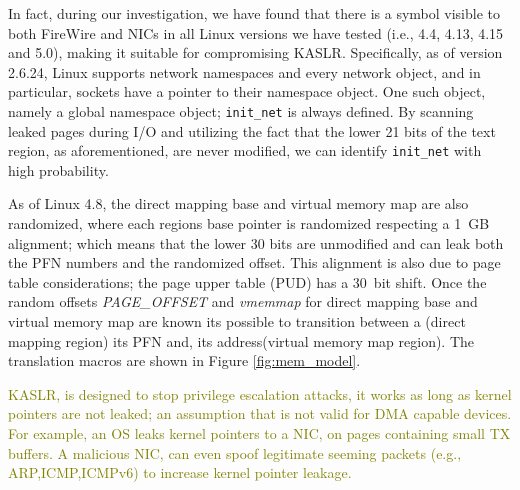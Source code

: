In fact, during our investigation, we have found that there is a symbol visible to both FireWire and NICs in all Linux versions we have tested (i.e., 4.4, 4.13, 4.15 and 5.0), making it suitable for compromising KASLR. Specifically, as of version 2.6.24, Linux supports network namespaces and every network object, and in particular, sockets have a pointer to their namespace object. One such object, namely a global namespace object; \texttt{init\_net} is always defined. By scanning leaked pages during I/O and utilizing the fact that the lower 21 bits of the text region, as aforementioned, are never modified, we can identify \texttt{init\_net} with high probability.

As of Linux 4.8, the direct mapping base and virtual memory map are also randomized, where each regions base pointer is randomized respecting a 1~GB alignment; which means that the lower 30 bits are unmodified and can leak both the PFN numbers and the randomized offset. This alignment is also due to page table considerations; the page upper table (PUD) has a 30~bit shift. Once the random offsets \textit{PAGE\_OFFSET} and \textit{vmemmap} for direct mapping base and virtual memory map are known its possible to transition between a \kva(direct mapping region) its PFN and, its \page{} address(virtual memory map region). The translation macros are shown in Figure \ref{fig:mem_model}. 

\textcolor{olive}{KASLR, is designed to stop privilege escalation attacks, it works as long as kernel pointers are not leaked; an assumption that is not valid for DMA capable devices. For example, an OS leaks kernel pointers to a NIC, on pages containing small TX buffers. A malicious NIC, can even spoof legitimate seeming packets (e.g., ARP,ICMP,ICMPv6) to increase kernel pointer leakage.}  
